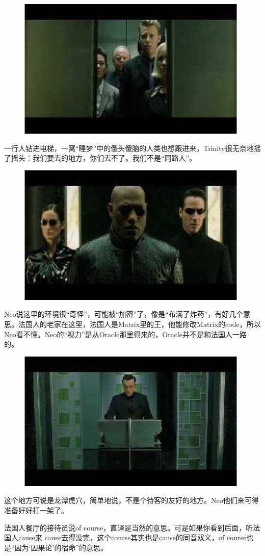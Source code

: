 \documentclass[UTF8]{ctexart}
\begin{document}
\begin{figure}[htb]
\centering
\includegraphics[width=0.5\linewidth]{fig/read_reloaded-87-1}
\end{figure}

一行人钻进电梯，一窝“睡梦”中的傻头傻脑的人类也想跟进来，Trinity很无奈地摇了摇头：我们要去的地方，你们去不了。我们不是“同路人”。

\begin{figure}[htb]
\centering
\includegraphics[width=0.5\linewidth]{fig/read_reloaded-88}
\end{figure}

Neo说这里的环境很“奇怪”，可能被“加密”了，像是“布满了炸药”，有好几个意思。法国人的老家在这里，法国人是Matrix里的王，他能修改Matrix的code，所以Neo看不懂。Neo的“视力”是从Oracle那里得来的，Oracle并不是和法国人一路的。

\begin{figure}[!htb]
\centering
\includegraphics[width=0.5\linewidth]{fig/read_reloaded-89}
\end{figure}

这个地方可说是龙潭虎穴，简单地说，不是个待客的友好的地方。Neo他们来可得准备好好打一架了。

法国人餐厅的接待员说of course，直译是当然的意思。可是如果你看到后面，听法国人cause来 cause去得没完，这个course其实也是cause的同音双义，of course也是“因为‘因果论’的宿命”的意思。
\end{document}
